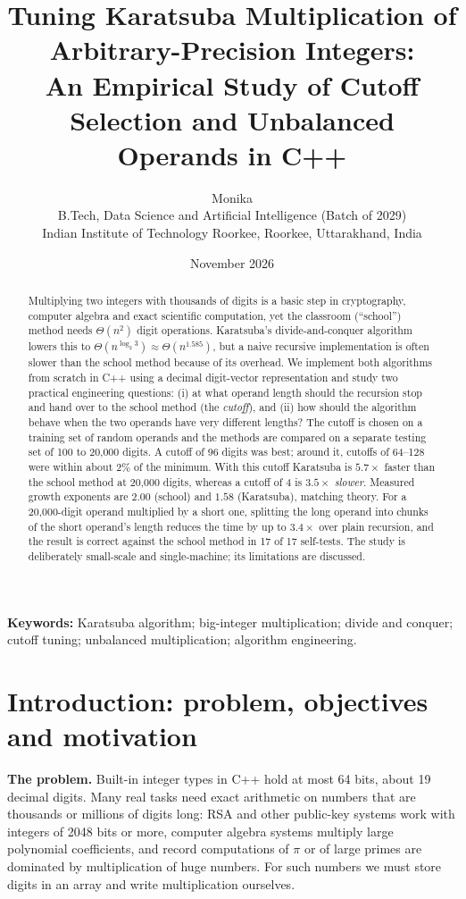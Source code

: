 \documentclass[11pt,a4paper]{article}
\title{\textbf{Tuning Karatsuba Multiplication of Arbitrary-Precision Integers:\\ An Empirical Study of Cutoff Selection and Unbalanced Operands in C++}}
\author{Monika\\[2pt]
\small B.Tech, Data Science and Artificial Intelligence (Batch of 2029)\\
\small Indian Institute of Technology Roorkee, Roorkee, Uttarakhand, India}
\date{November 2026}
\begin{document}
\maketitle

\begin{abstract}
\noindent Multiplying two integers with thousands of digits is a basic step in cryptography, computer algebra and exact scientific computation, yet the classroom (``school'') method needs $\Theta(n^2)$ digit operations. Karatsuba's divide-and-conquer algorithm lowers this to $\Theta(n^{\log_2 3})\approx\Theta(n^{1.585})$, but a naive recursive implementation is often slower than the school method because of its overhead. We implement both algorithms from scratch in C++ using a decimal digit-vector representation and study two practical engineering questions: (i) at what operand length should the recursion stop and hand over to the school method (the \emph{cutoff}), and (ii) how should the algorithm behave when the two operands have very different lengths? The cutoff is chosen on a training set of random operands and the methods are compared on a separate testing set of 100 to 20{,}000 digits. A cutoff of 96 digits was best; around it, cutoffs of 64--128 were within about 2\% of the minimum. With this cutoff Karatsuba is $5.7\times$ faster than the school method at 20{,}000 digits, whereas a cutoff of 4 is $3.5\times$ \emph{slower}. Measured growth exponents are $2.00$ (school) and $1.58$ (Karatsuba), matching theory. For a 20{,}000-digit operand multiplied by a short one, splitting the long operand into chunks of the short operand's length reduces the time by up to $3.4\times$ over plain recursion, and the result is correct against the school method in 17 of 17 self-tests. The study is deliberately small-scale and single-machine; its limitations are discussed.
\end{abstract}

\noindent\textbf{Keywords:} Karatsuba algorithm; big-integer multiplication; divide and conquer; cutoff tuning; unbalanced multiplication; algorithm engineering.

\section{Introduction: problem, objectives and motivation}
\label{sec:intro}

\textbf{The problem.} Built-in integer types in C++ hold at most 64 bits, about 19 decimal digits. Many real tasks need exact arithmetic on numbers that are thousands or millions of digits long: RSA and other public-key systems work with integers of 2048 bits or more, computer algebra systems multiply large polynomial coefficients, and record computations of $\pi$ or of large primes are dominated by multiplication of huge numbers. For such numbers we must store digits in an array and write multiplication ourselves.
\end{document}
